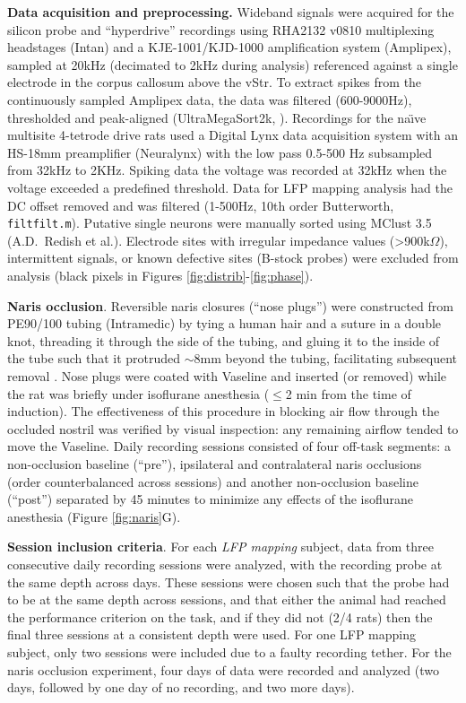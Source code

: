 \documentclass[11pt]{article}
\let\citeNP=\citealt
\begin{document}
{\bf Data acquisition and preprocessing.}  Wideband signals were
acquired for the silicon probe and ``hyperdrive'' recordings using
RHA2132 v0810 multiplexing headstages (Intan) and a KJE-1001/KJD-1000
amplification system (Amplipex), sampled at 20kHz (decimated to 2kHz
during analysis) referenced against a single electrode in the corpus
callosum above the vStr.  To extract spikes from the continuously
sampled Amplipex data, the data was filtered (600-9000Hz), thresholded
and peak-aligned (UltraMegaSort2k, \citeNP{Hill2011}).  Recordings for
the na\"{\i}ve multisite 4-tetrode drive rats used a Digital Lynx data
acquisition system with an HS-18mm preamplifier (Neuralynx) with the
low pass 0.5-500 Hz subsampled from 32kHz to 2KHz.  Spiking data the
voltage was recorded at 32kHz when the voltage exceeded a predefined
threshold.  Data for LFP mapping analysis had the DC offset removed
and was filtered (1-500Hz, 10th order Butterworth, {\tt
  filtfilt.m}). Putative single neurons were manually sorted using
MClust 3.5 (A.D.\ Redish et al.).  Electrode sites with irregular
impedance values (\textgreater900k$\Omega$), intermittent signals, or
known defective sites (B-stock probes) were excluded from analysis
(black pixels in Figures \ref{fig:distrib}-\ref{fig:phase}).

{\bf Naris occlusion}. Reversible naris closures (``nose plugs'') were
constructed from PE90/100 tubing (Intramedic) by tying a human hair
and a suture in a double knot, threading it through the side of the
tubing, and gluing it to the inside of the tube such that it protruded
$\sim$8mm beyond the tubing, facilitating subsequent removal
\citep{Kucharski1987, Cummings1997}. Nose plugs were coated with
Vaseline and inserted (or removed) while the rat was briefly under
isoflurane anesthesia ($\le$2 min from the time of induction). The
effectiveness of this procedure in blocking air flow through the
occluded nostril was verified by visual inspection: any remaining
airflow tended to move the Vaseline. Daily recording sessions
consisted of four off-task segments: a non-occlusion baseline
(``pre''), ipsilateral and contralateral naris occlusions (order
counterbalanced across sessions) and another non-occlusion baseline
(``post'') separated by 45 minutes to minimize any effects of the
isoflurane anesthesia (Figure \ref{fig:naris}G).

{\bf Session inclusion criteria}. For each {\it LFP mapping} subject,
data from three consecutive daily recording sessions were analyzed,
with the recording probe at the same depth across days. These sessions
were chosen such that the probe had to be at the same depth across
sessions, and that either the animal had reached the performance
criterion on the task, and if they did not (2/4 rats) then the final
three sessions at a consistent depth were used. For one LFP mapping
subject, only two sessions were included due to a faulty recording
tether. For the naris occlusion experiment, four days of data were
recorded and analyzed (two days, followed by one day of no recording,
and two more days).
\end{document}
